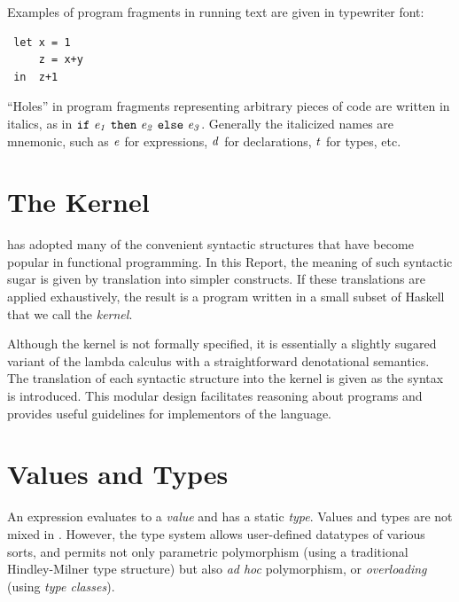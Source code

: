 Examples of \Haskell{} program fragments in running text are given
in typewriter font:
\bprog
{\small\begin{verbatim}
 let x = 1
     z = x+y
 in  z+1
\end{verbatim}}
\eprog
``Holes'' in program fragments representing arbitrary
pieces of \Haskell{} code are written in italics, as in 
\mbox{$\it \makebox{\tt if}\ e_1\ \makebox{\tt then}\ e_2\ \makebox{\tt else}\ e_3$}.  Generally the italicized names are
mnemonic, such as \mbox{$\it e$} for expressions, \mbox{$\it d$} for
declarations, \mbox{$\it t$} for types, etc.

\section{The \Haskell{} Kernel}
\label{intro-kernel}

\Haskell{} has adopted many of the convenient syntactic structures
that have become popular
in functional programming.  In this Report, the meaning of such
syntactic sugar is given by translation into simpler constructs.
If these translations are applied exhaustively, the result is a program
written in a small subset of Haskell that we call the \Haskell{} {\em kernel}.

Although the kernel is not formally specified, it is essentially a
slightly sugared variant of the lambda calculus with a straightforward
denotational semantics.  The translation of each syntactic structure
into the kernel is given as the syntax is introduced.  This modular
design facilitates reasoning about \Haskell{} programs and provides
useful guidelines for implementors of the language.


\section{Values and Types}
\label{errors}

An expression evaluates to a {\em value} and has a
static {\em type}.  Values and types are not mixed in
\Haskell{}.
However, the type system
allows user-defined datatypes of various sorts, and permits not only
parametric polymorphism (using a
traditional Hindley-Milner type structure) but
also {\em ad hoc} polymorphism, or {\em overloading} (using
{\em type classes}).

